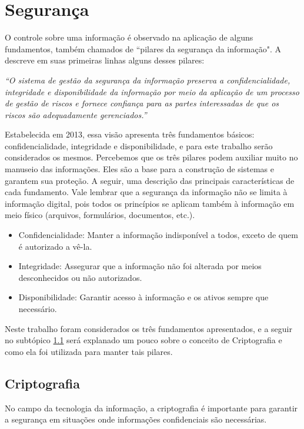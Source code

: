 \documentclass[12pt, a4paper]{report}
\begin{document}
\section{ Segurança}
\label{sec:seguranca}

O controle sobre uma informação é observado na aplicação de alguns fundamentos, também chamados de “pilares da segurança da informação". A \cite{iso27001} descreve em suas primeiras linhas alguns desses pilares:

\textit{“O sistema de gestão da segurança da informação preserva a confidencialidade, integridade e disponibilidade da informação por meio da aplicação de um processo de gestão de riscos e fornece confiança para as partes interessadas de que os riscos são adequadamente gerenciados.”}

Estabelecida em 2013, essa visão apresenta três fundamentos básicos: confidencialidade, integridade e disponibilidade, e para este trabalho serão considerados os mesmos. Percebemos que os três pilares podem auxiliar muito no manuseio das informações. Eles são a base para a construção de sistemas e garantem sua proteção. A seguir, uma descrição das principais características de cada fundamento. Vale lembrar que a segurança da informação não se limita à informação digital, pois todos os princípios se aplicam também à informação em meio físico (arquivos, formulários, documentos, etc.).
\begin{itemize}
\item Confidencialidade: Manter a informação indisponível a todos, exceto de quem é autorizado a vê-la.
\item Integridade: Assegurar que a informação não foi alterada por meios desconhecidos ou não autorizados.
\item Disponibilidade: Garantir acesso à informação e os ativos sempre que necessário.
\end{itemize}

Neste trabalho foram considerados os três fundamentos apresentados, e a seguir no subtópico \ref{subsec:criptografia} será explanado um pouco sobre o conceito de Criptografia e como ela foi utilizada para manter tais pilares.

\subsection{Criptografia}
\label{subsec:criptografia}

No campo da tecnologia da informação, a criptografia é importante para garantir a segurança em situações onde informações confidenciais são necessárias.
\end{document}
